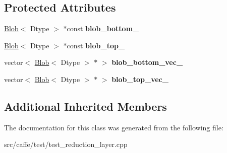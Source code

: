 \subsection*{Protected Attributes}
\begin{DoxyCompactItemize}
\item 
\mbox{\label{classcaffe_1_1_reduction_layer_test_aba4f11b6193648e18c46c7b5c157f18c}} 
\mbox{\hyperlink{classcaffe_1_1_blob}{Blob}}$<$ Dtype $>$ $\ast$const {\bfseries blob\+\_\+bottom\+\_\+}
\item 
\mbox{\label{classcaffe_1_1_reduction_layer_test_a00e89ec571a8ead38372f526eb02fa78}} 
\mbox{\hyperlink{classcaffe_1_1_blob}{Blob}}$<$ Dtype $>$ $\ast$const {\bfseries blob\+\_\+top\+\_\+}
\item 
\mbox{\label{classcaffe_1_1_reduction_layer_test_aa38d75e3eb5d8621a41c524e7ef9da44}} 
vector$<$ \mbox{\hyperlink{classcaffe_1_1_blob}{Blob}}$<$ Dtype $>$ $\ast$ $>$ {\bfseries blob\+\_\+bottom\+\_\+vec\+\_\+}
\item 
\mbox{\label{classcaffe_1_1_reduction_layer_test_aa6c504539855c61ae154a128d6a470b9}} 
vector$<$ \mbox{\hyperlink{classcaffe_1_1_blob}{Blob}}$<$ Dtype $>$ $\ast$ $>$ {\bfseries blob\+\_\+top\+\_\+vec\+\_\+}
\end{DoxyCompactItemize}
\subsection*{Additional Inherited Members}


The documentation for this class was generated from the following file\+:\begin{DoxyCompactItemize}
\item 
src/caffe/test/test\+\_\+reduction\+\_\+layer.\+cpp\end{DoxyCompactItemize}
